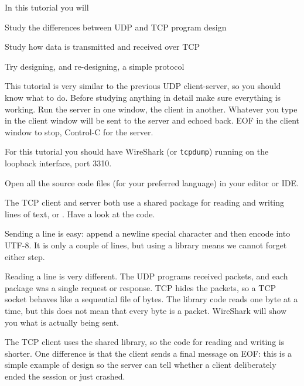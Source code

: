 









In this tutorial you will

\DOT Study the differences between UDP and TCP program design

\DOT Study how data is transmitted and received over TCP

\DOT Try designing, and re-designing, a simple protocol


This tutorial is very similar to the previous UDP client-server, so you should
know what to do. Before studying anything in detail make sure everything is
working. Run the server in one window, the client in another. Whatever
you type in the client window will be sent to the server and echoed back. EOF
in the client window to stop, Control-C for the server.

For this tutorial you should have WireShark (or \texttt{tcpdump}) running
on the loopback interface, port 3310.



Open all the source code files (for your preferred language) in your editor
or IDE.

The TCP client and server both use a shared package for reading and writing
lines of text,  or . Have a look at the
code.

Sending a line is easy: append a newline special character and then encode
into UTF-8. It is only a couple of lines, but using a library means we cannot
forget either step.

Reading a line is very different. The UDP programs received packets, and each
package was a single request or response. TCP hides the packets, so a TCP
socket behaves like a sequential file of bytes. The library code reads one
byte at a time, but this does not mean that every byte is a packet. WireShark
will show you what is actually being sent.

The TCP client uses the shared library, so the code for reading and writing
is shorter. One difference is that the client sends a final message on EOF:
this is a simple example of  design so the server can tell
whether a client deliberately ended the session or just crashed.

